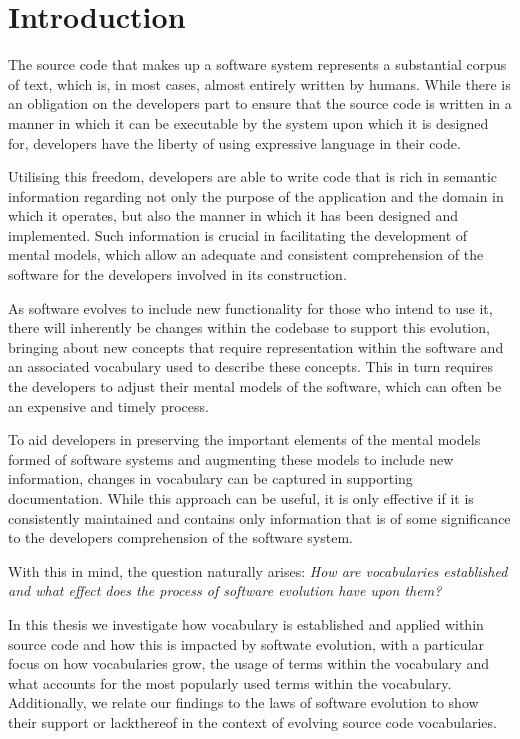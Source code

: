\chapter{Introduction}
\label{chapter:Introduction} 

The source code that makes up a software system represents a substantial corpus of text, which is, in most cases, almost entirely written by humans. While there is an obligation on the developers part to ensure that the source code is written in a manner in which it can be executable by the system upon which it is designed for, developers have the liberty of using expressive language in their code.

Utilising this freedom, developers are able to write code that is rich in semantic information regarding not only the purpose of the application and the domain in which it operates, but also the manner in which it has been designed and implemented. Such information is crucial in facilitating the development of mental models, which allow an adequate and consistent comprehension of the software for the developers involved in its construction.

As software evolves to include new functionality for those who intend to use it, there will inherently be changes within the codebase to support this evolution, bringing about new concepts that require representation within the software and an associated vocabulary used to describe these concepts. This in turn requires the developers to adjust their mental models of the software, which can often be an expensive and timely process.

To aid developers in preserving the important elements of the mental models formed of software systems and augmenting these models to include new information, changes in vocabulary can be captured in supporting documentation. While this approach can be useful, it is only effective if it is consistently maintained and contains only information that is of some significance to the developers comprehension of the software system.

With this in mind, the question naturally arises: \emph{How are vocabularies established and what effect does the process of software evolution have upon them?}

In this thesis we investigate how vocabulary is established and applied within source code and how this is impacted by softwate evolution, with a particular focus on how vocabularies grow, the usage of terms within the vocabulary and what accounts for the most popularly used terms within the vocabulary. Additionally, we relate our findings to the laws of software evolution to show their support or lackthereof in the context of evolving source code vocabularies.

